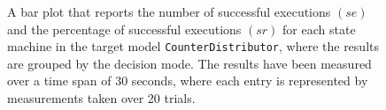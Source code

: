 \begin{figure}[h!]
\centering
\begin{minipage}{1\textwidth}
  \centering
  \makebox[\textwidth][c]{ %
        \resizebox{1.19\textwidth}{!}{ %
            
        }%
    }%
\end{minipage}
\caption{A bar plot that reports the number of successful executions $(se)$ and the percentage of successful executions $(sr)$ for each state machine in the target model \texttt{CounterDistributor}, where the results are grouped by the decision mode. The results have been measured over a time span of 30 seconds, where each entry is represented by measurements taken over 20 trials.}
\label{figure:decision_mode_state_machine_transition_frequency_comparison_counterdistributor}
\end{figure}